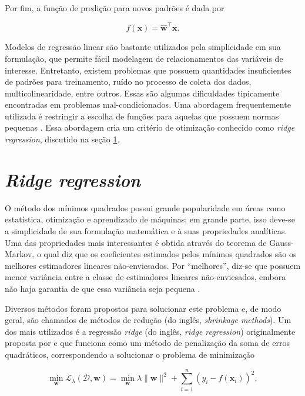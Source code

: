 Por fim, a função de predição para novos padrões é dada por

\begin{equation}
    \label{ch2:eq10}
    f(\mathbf{x}) = \mathbf{\hat{w}}^{\top}\mathbf{x}.
\end{equation}

Modelos de regressão linear são bastante utilizados pela simplicidade em sua formulação, que permite fácil modelagem de relacionamentos das variáveis de interesse. Entretanto, existem problemas que possuem quantidades insuficientes de padrões para treinamento, ruído no processo de coleta dos dados, multicolinearidade, entre outros. Essas são algumas dificuldades tipicamente encontradas em problemas mal-condicionados. Uma abordagem frequentemente utilizada é restringir a escolha de funções para aquelas que possuem normas pequenas \cite{shawe2004}. Essa abordagem cria um critério de otimização conhecido como \textit{ridge regression}, discutido na seção \ref{sec:ridge}.

\section{\textit{Ridge regression}} \label{sec:ridge}
O método dos mínimos quadrados possui grande popularidade em áreas como estatística, otimização e aprendizado de máquinas; em grande parte, isso deve-se a simplicidade de sua formulação matemática e à suas propriedades analíticas. Uma das propriedades mais interessantes é obtida através do teorema de Gauss-Markov, o qual diz que os coeficientes estimados pelos mínimos quadrados são os melhores estimadores lineares não-enviesados. Por ``melhores'', diz-se que possuem menor variância entre a classe de estimadores lineares não-enviesados, embora não haja garantia de que essa variância seja pequena \cite{montgomery2012}.

Diversos métodos foram propostos para solucionar este problema e, de modo geral, são chamados de métodos de redução (do inglês, \textit{shrinkage methods}). Um dos mais utilizados é a regressão \textit{ridge} (do inglês, \textit{ridge regression}) originalmente proposta por  e que funciona como um método de penalização da soma de erros quadráticos, correspondendo a solucionar o problema de minimização

\begin{equation}
    \label{ch2:eq11}
    \min_{\mathbf{w}} \mathcal{L}_{\lambda}(\mathcal{D}, \mathbf{w}) = \min_{\mathbf{w}} \lambda \|\mathbf{w}\|^2 + \sum_{i=1}^{n}{(y_i - f(\mathbf{x}_i))^2},
\end{equation}

